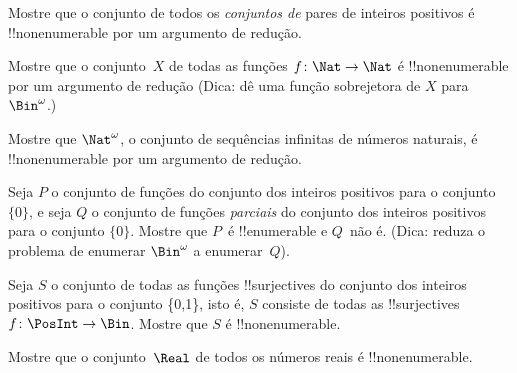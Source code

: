 \documentclass[../../../include/open-logic-section]{subfiles}
\begin{document}
\begin{prob}
Mostre que o conjunto de todos os \emph{conjuntos de} pares de inteiros positivos é
!!{nonenumerable} por um argumento de redução.
\end{prob}

\begin{prob}\label{sfr:siz:red:prob:nat-nat}
  Mostre que o conjunto~$X$ de todas as funções $f\colon \Nat \to \Nat$ é
  !!{nonenumerable} por um argumento de redução (Dica: dê uma função sobrejetora
  de $X$ para~$\Bin^\omega$.)
\end{prob}

\begin{prob}
Mostre que $\Nat^\omega$, o conjunto de sequências infinitas de
números naturais, é !!{nonenumerable} por um argumento de redução.
\end{prob}

\begin{prob}
Seja $P$ o conjunto de funções do conjunto dos inteiros positivos
para o conjunto $\{0\}$, e seja $Q$ o conjunto de funções \emph{parciais}
do conjunto dos inteiros positivos para o conjunto $\{0\}$. Mostre
que $P$~é !!{enumerable} e $Q$~não é. (Dica: reduza o problema
de enumerar $\Bin^\omega$ a enumerar~$Q$).
\end{prob}

\begin{prob}
Seja $S$ o conjunto de todas as funções !!{surjective}s do conjunto dos
inteiros positivos para o conjunto \{0,1\}, isto é, $S$ consiste de todas as
!!{surjective}s~$f\colon \PosInt \to \Bin$. Mostre que $S$ é
!!{nonenumerable}.
\end{prob}

\begin{prob}
Mostre que o conjunto~$\Real$ de todos os números reais é !!{nonenumerable}.
\end{prob}
\end{document}
